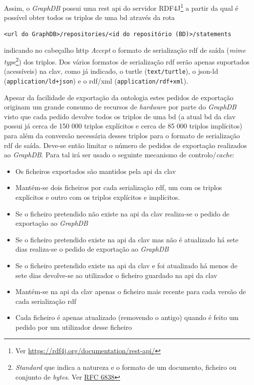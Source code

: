 Assim, o \textit{GraphDB} possui uma \acrshort{rest} \acrshort{api} do servidor RDF4J\footnote{Ver \url{https://rdf4j.org/documentation/rest-api/}} a partir da qual é possível obter todos os triplos de uma \acrshort{bd} através da rota
\begin{verbatim}
<url do GraphDB>/repositories/<id do repositório (BD)>/statements
\end{verbatim}
indicando no cabeçalho \acrshort{http} \textit{Accept} o formato de serialização \acrshort{rdf} de saída (\textit{\acrshort{mime} type}\footnote{\textit{Standard} que indica a natureza e o formato de um documento, ficheiro ou conjunto de \textit{bytes}. Ver \href{https://tools.ietf.org/html/rfc6838}{RFC 6838}}) dos triplos. Dos vários formatos de serialização \acrshort{rdf} serão apenas suportados (acessíveis) na \acrshort{clav}, como já indicado, o \acrshort{turtle} (\texttt{text/turtle}), o \acrshort{json-ld} (\texttt{application/ld+json}) e o \acrshort{rdf}/\acrshort{xml} (\texttt{application/rdf+xml}).

Apesar da facilidade de exportação da ontologia estes pedidos de exportação originam um grande consumo de recursos de \textit{hardware} por parte do \textit{GraphDB} visto que cada pedido devolve todos os triplos de uma \acrshort{bd} (a atual \acrshort{bd} da \acrshort{clav} possui já cerca de 150 000 triplos explícitos e cerca de 85 000 triplos implícitos) para além da conversão necessária desses triplos para o formato de serialização \acrshort{rdf} de saída. Deve-se então limitar o número de pedidos de exportação realizados ao \textit{GraphDB}. Para tal irá ser usado o seguinte mecanismo de controlo/\textit{cache}:

\begin{itemize}
    \item Os ficheiros exportados são mantidos pela \acrshort{api} da \acrshort{clav}
    \item Mantém-se dois ficheiros por cada serialização \acrshort{rdf}, um com os triplos explícitos e outro com os triplos explícitos e implícitos.
    \item Se o ficheiro pretendido não existe na \acrshort{api} da \acrshort{clav} realiza-se o pedido de exportação ao \textit{GraphDB}
    \item Se o ficheiro pretendido existe na \acrshort{api} da \acrshort{clav} mas não é atualizado há sete dias realiza-se o pedido de exportação ao \textit{GraphDB}
    \item Se o ficheiro pretendido existe na \acrshort{api} da \acrshort{clav} e foi atualizado há menos de sete dias devolve-se ao utilizador o ficheiro guardado na \acrshort{api} da \acrshort{clav}
    \item Mantém-se na \acrshort{api} da \acrshort{clav} apenas o ficheiro mais recente para cada versão de cada serialização \acrshort{rdf}
    \item Cada ficheiro é apenas atualizado (removendo o antigo) quando é feito um pedido por um utilizador desse ficheiro
\end{itemize}

